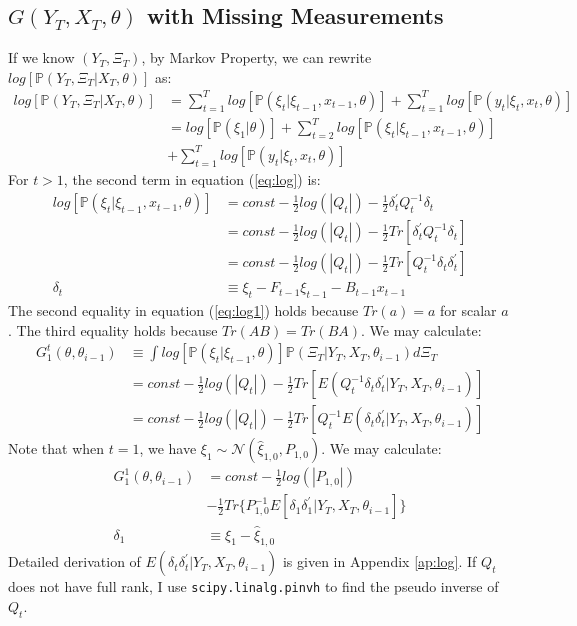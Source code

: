 \documentclass[12pt]{article}
\numberwithin{equation}{section}
\begin{document}
\subsection{$G(Y_T,X_T,\theta)$ with Missing Measurements}
If we know $(Y_T,\Xi_T)$, by Markov Property, we can rewrite $log[\mathbb{P}(Y_T,\Xi_T|X_T,\theta)]$ as:
\begin{align}
    log[\mathbb{P}(Y_T,\Xi_T|X_T,\theta)] &= \sum_{t=1}^{T}log[\mathbb{P}(\xi_t|\xi_{t-1},x_{t-1},\theta)] 
    + \sum_{t=1}^{T}log[\mathbb{P}(y_t|\xi_t,x_t,\theta)] \nonumber \\
    &= log[\mathbb{P}(\xi_1|\theta)] + \sum_{t=2}^{T}log[\mathbb{P}(\xi_t|\xi_{t-1},x_{t-1},\theta)] \nonumber \\ 
    &+ \sum_{t=1}^{T}log[\mathbb{P}(y_t|\xi_t,x_t,\theta)]\label{eq:log}
\end{align}
For $t>1$, the second term in equation (\ref{eq:log}) is:
\begin{align}
    log[\mathbb{P}(\xi_t|\xi_{t-1},x_{t-1},\theta)] &= const-\frac{1}{2}log(|Q_t|) 
    -\frac{1}{2}\delta_t^{'}Q_t^{-1}\delta_t \nonumber \\
    &= const-\frac{1}{2}log(|Q_t|) 
    -\frac{1}{2}Tr[\delta_t^{'}Q_t^{-1}\delta_t] \nonumber \\
    &= const-\frac{1}{2}log(|Q_t|) 
    -\frac{1}{2}Tr[Q_t^{-1}\delta_t\delta_t^{'}] \label{eq:log1} \\
    \delta_t &\equiv \xi_t - F_{t-1}\xi_{t-1}-B_{t-1}x_{t-1} \nonumber
\end{align}
The second equality in equation (\ref{eq:log1}) holds because $Tr(a)=a$ for scalar $a$. The third equality holds because $Tr(AB)=Tr(BA)$. 
We may calculate:
\begin{align}
    G_1^{t}(\theta,\theta_{i-1}) &\equiv \int log[\mathbb{P}(\xi_t|\xi_{t-1},\theta)]\mathbb{P}(\Xi_T|Y_T,X_T,\theta_{i-1})d\Xi_T \nonumber \\
    &= const -\frac{1}{2}log(|Q_t|)-\frac{1}{2}Tr[E(Q_t^{-1}\delta_t\delta_t^{'}|Y_T,X_T,\theta_{i-1})] \nonumber \\
    &= const - \frac{1}{2}log(|Q_t|) - \frac{1}{2}Tr[Q_t^{-1}E(\delta_t\delta_t^{'}|Y_T,X_T,\theta_{i-1})] \label{eq:log1_trace}
\end{align}
Note that when $t=1$, we have $\xi_1\sim\mathcal{N}(\hat{\xi}_{1,0}, P_{1,0})$. We may calculate:
\begin{align}
    G_1^1(\theta,\theta_{i-1}) &= const - \frac{1}{2}log(|P_{1,0}|) \nonumber \\
    &- \frac{1}{2}Tr\{P_{1,0}^{-1}E[\delta_1\delta_1^{'}|Y_T, X_T, \theta_{i-1}]\} \nonumber \\
    \delta_1 &\equiv \xi_1 - \hat{\xi}_{1,0}
\end{align}
Detailed derivation of $E(\delta_t\delta_t^{'}|Y_T,X_T,\theta_{i-1})$ is given in Appendix \ref{ap:log}. If $Q_t$ does not have full rank, I use \texttt{scipy.linalg.pinvh} to find the pseudo inverse of $Q_t$. 
\end{document}
